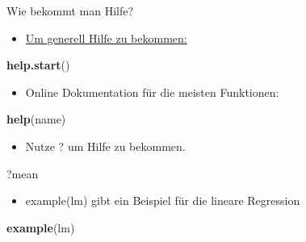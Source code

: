 \documentclass[
  ignorenonframetext,
]{beamer}
\newenvironment{Shaded}{\begin{snugshade}}{\end{snugshade}}
\newcommand{\KeywordTok}[1]{\textcolor[rgb]{0.26,0.66,0.93}{\textbf{#1}}}
\newcommand{\NormalTok}[1]{\textcolor[rgb]{0.74,0.68,0.62}{#1}}
\providecommand{\tightlist}{%
  \setlength{\itemsep}{0pt}\setlength{\parskip}{0pt}}
\begin{document}
\begin{frame}[fragile]{Wie bekommt man Hilfe?}
\protect\hypertarget{wie-bekommt-man-hilfe-1}{}

\begin{itemize}
\tightlist
\item
  \href{http://itfeature.com/tag/how-to-get-help-in-r}{Um generell Hilfe
  zu bekommen:}
\end{itemize}

\begin{Shaded}
\begin{Highlighting}[]
\KeywordTok{help.start}\NormalTok{()}
\end{Highlighting}
\end{Shaded}

\begin{itemize}
\tightlist
\item
  Online Dokumentation für die meisten Funktionen:
\end{itemize}

\begin{Shaded}
\begin{Highlighting}[]
\KeywordTok{help}\NormalTok{(name)}
\end{Highlighting}
\end{Shaded}

\begin{itemize}
\tightlist
\item
  Nutze ? um Hilfe zu bekommen.
\end{itemize}

\begin{Shaded}
\begin{Highlighting}[]
\NormalTok{?mean}
\end{Highlighting}
\end{Shaded}

\begin{itemize}
\tightlist
\item
  example(lm) gibt ein Beispiel für die lineare Regression
\end{itemize}

\begin{Shaded}
\begin{Highlighting}[]
\KeywordTok{example}\NormalTok{(lm)}
\end{Highlighting}
\end{Shaded}

\end{frame}
\end{document}
